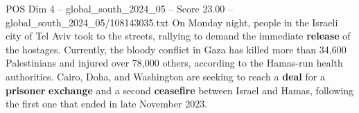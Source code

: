 \begin{textsample}{POS Dim 4 – global\_south\_2024\_05 – Score 23.00 – global\_south\_2024\_05/108143035.txt}
On Monday night, people in the Israeli city of Tel Aviv took to the streets, rallying to demand the immediate \textbf{release} of the hostages.
Currently, the bloody conflict in Gaza has killed more than 34,600 Palestinians and injured over 78,000 others, according to the Hamas-run health authorities.
Cairo, Doha, and Washington are seeking to reach a \textbf{deal} for a \textbf{prisoner} \textbf{exchange} and a second \textbf{ceasefire} between Israel and Hamas, following the first one that ended in late November 2023.

\end{textsample}
